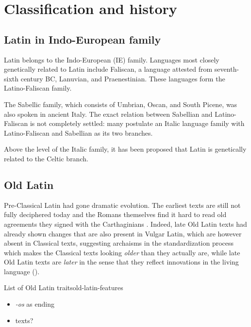 \documentclass[a4paper, oneside, 12pt]{report}
\newcommand*{\citepage}[1]{p.~{#1}}
\newcommand{\form}[1]{\emph{#1}}
\begin{document}
\section{Classification and history}\label{sec:introduction.history}

\subsection{Latin in Indo-European family}

Latin belongs to the Indo-European (IE) family.
Languages most closely genetically related to Latin include Faliscan,
a language attested from seventh-sixth century BC,
Lanuvian, and Praenestinian.
These languages form the Latino-Faliscan family.

The Sabellic family, which consists of Umbrian, Oscan, and South Picene,
was also spoken in ancient Italy.
The exact relation between Sabellian and Latino-Faliscan is not completely settled:
many postulate an Italic language family
with Latino-Faliscan and Sabellian as its two branches.

Above the level of the Italic family,
it has been proposed that Latin is genetically related to the Celtic branch. 

\subsection{Old Latin}

Pre-Classical Latin had gone dramatic evolution.
The earliest texts are still not fully deciphered today
and the Romans themselves find it hard to read old agreements they signed with the Carthaginians
\citep[\citepage{52}]{leonhardt2013latin}.
Indeed, late Old Latin texts had already shown changes that are also present in Vulgar Latin,
which are however absent in Classical texts,
suggesting archaisms in the standardization process
which makes the Classical texts looking \emph{older} than they actually are,
while late Old Latin texts are \emph{later} in the sense that they reflect 
innovations in the living language
().

\begin{todobox}{List of Old Latin traits}{old-latin-features}
    \begin{itemize}
        \item \form{-os} as ending
        \item texts?
    \end{itemize}
\end{todobox}
\end{document}
